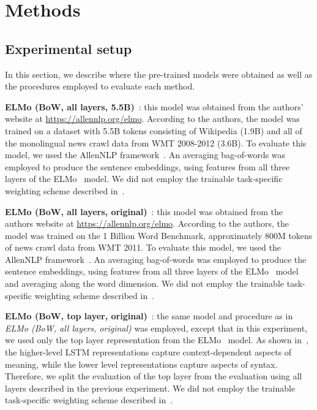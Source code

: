 \documentclass{article}
\begin{document}
\section{Methods}
\label{sec:methods}

\subsection{Experimental setup}
In this section, we describe where the pre-trained models were obtained as well as the procedures employed to evaluate each method.

\textbf{ELMo (BoW, all layers, 5.5B)}~\cite{peters2018deep}: this model was obtained from the authors' website at \url{https://allennlp.org/elmo}. According to the authors, the model was trained on a dataset with 5.5B tokens consisting of Wikipedia (1.9B) and all of the monolingual news crawl data from WMT 2008-2012 (3.6B). To evaluate this model, we used the AllenNLP framework~\cite{Gardner2017AllenNLP}. An averaging bag-of-words was employed to produce the sentence embeddings, using features from all three layers of the ELMo~\cite{peters2018deep} model. We did not employ the trainable task-specific weighting scheme described in~\cite{peters2018deep}.

\textbf{ELMo (BoW, all layers, original)}~\cite{peters2018deep}: this model was obtained from the authors website at \url{https://allennlp.org/elmo}. According to the authors, the model was trained on the 1 Billion Word Benchmark, approximately 800M tokens of news crawl data from WMT 2011. To evaluate this model, we used the AllenNLP framework~\cite{Gardner2017AllenNLP}. An averaging bag-of-words was employed to produce the sentence embeddings, using features from all three layers of the ELMo~\cite{peters2018deep} model and averaging along the word dimension. We did not employ the trainable task-specific weighting scheme described in~\cite{peters2018deep}.

\textbf{ELMo (BoW, top layer, original)}~\cite{peters2018deep}: the same model and procedure as in \emph{ELMo (BoW, all layers, original)} was employed, except that in this experiment, we used only the top layer representation from the ELMo~\cite{peters2018deep} model. As shown in~\cite{peters2018deep}, the higher-level LSTM representations capture context-dependent aspects
of meaning, while the lower level
representations capture aspects of syntax. Therefore, we split the evaluation of the top layer from the evaluation using all layers described in the previous experiment. We did not employ the trainable task-specific weighting scheme described in~\cite{peters2018deep}.
\end{document}
